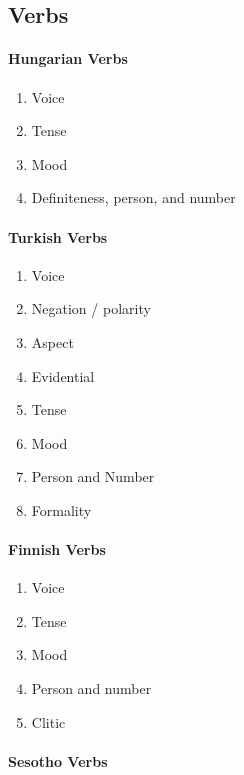 \documentclass[11pt,letterpaper]{article}
\begin{document}
\subsection{Verbs}

\paragraph{Hungarian Verbs}
\begin{enumerate}
    \item Voice
    \item Tense 
    \item Mood
    \item Definiteness, person, and number
\end{enumerate}

\paragraph{Turkish Verbs}
\begin{enumerate}
    \item Voice
    \item Negation / polarity
    \item Aspect
    \item Evidential 
    \item Tense 
    \item Mood 
    \item Person and Number
    \item Formality
\end{enumerate}

\paragraph{Finnish Verbs}
\begin{enumerate}
    \item Voice
    \item Tense 
    \item Mood 
    \item Person and number
    \item Clitic
\end{enumerate}

\paragraph{Sesotho Verbs}
\end{document}

